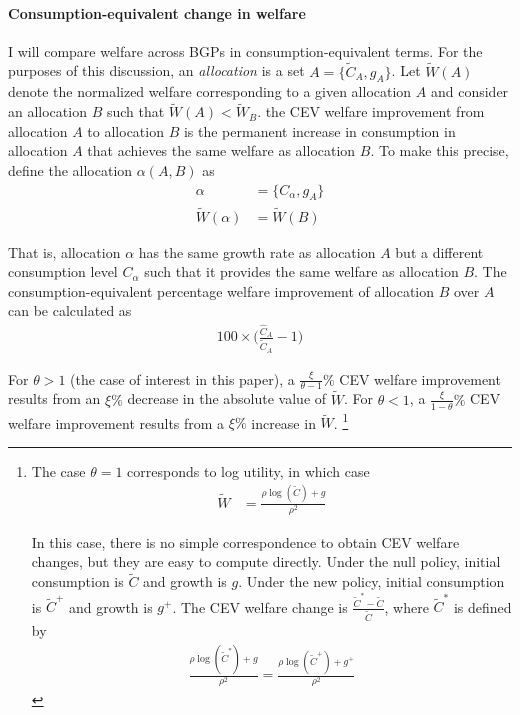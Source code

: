 \documentclass[11pt,english]{article}
\begin{document}
\paragraph{Consumption-equivalent change in welfare} 

I will compare welfare across BGPs in consumption-equivalent terms. For the purposes of this discussion, an \textit{allocation} is a set $A = \{ \tilde{C}_A, g_A \}$. Let $\tilde{W}(A)$ denote the normalized welfare corresponding to a given allocation $A$ and consider an allocation $B$ such that $\tilde{W}(A) < \tilde{W}_B$. the CEV welfare improvement from allocation $A$ to allocation $B$ is the permanent increase in consumption in allocation $A$ that achieves the same welfare as allocation $B$. To make this precise, define the allocation $\alpha(A,B)$ as
\begin{align}
\alpha &= \{C_{\alpha}, g_A\} \\
\tilde{W} ( \alpha ) &= \tilde{W} ( B ) 
\end{align}

That is, allocation $\alpha$ has the same growth rate as allocation $A$ but a different consumption level $C_{\alpha}$ such that it provides the same welfare as allocation $B$. The consumption-equivalent percentage welfare improvement of allocation $B$ over $A$ can be calculated as
\begin{align}
100 \times \big(\frac{\hat{C}_A}{\tilde{C}_A} - 1 \big) 
\end{align}

For $\theta > 1$ (the case of interest in this paper), a $\frac{\xi}{\theta-1}\%$ CEV welfare improvement results from an $\xi\%$ decrease in the absolute value of $\tilde{W}$. For $\theta < 1$, a $\frac{\xi}{1-\theta}\%$ CEV welfare improvement results from a $\xi\%$ increase in $\tilde{W}$. \footnote{The case $\theta = 1$ corresponds to log utility, in which case
	\begin{align}
	\tilde{W} &= \frac{\rho \log(\tilde{C}) + g}{\rho^2} \label{eq:agg_welfare_log}
	\end{align}
	
	In this case, there is no simple correspondence to obtain CEV welfare changes, but they are easy to compute directly. Under the null policy, initial consumption is $\tilde{C}$ and growth is $g$. Under the new policy, initial consumption is $\tilde{C}^+$ and growth is $g^+$. The CEV welfare change is $\frac{\tilde{C}^* - \tilde{C}}{\tilde{C}}$, where $\tilde{C}^*$ is defined by 
	\begin{align}
	\frac{\rho\log(\tilde{C}^*) + g}{\rho^2} = \frac{\rho \log(\tilde{C}^+) + g^+}{\rho^2} \label{eq:agg_welfare_log_CEV}
	\end{align}}
\end{document}
